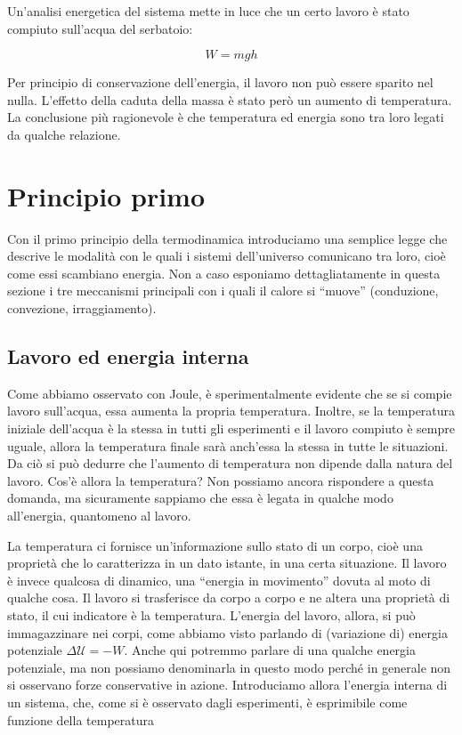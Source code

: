 Un'analisi energetica del sistema mette in luce che un certo lavoro è
stato compiuto sull'acqua del serbatoio:

\[ W = mgh \]

\noindent Per principio di conservazione dell'energia, il lavoro non
può essere sparito nel nulla. L'effetto della caduta della massa è stato però un aumento di temperatura.
La conclusione più ragionevole è che temperatura ed energia sono tra
loro legati da qualche relazione.




\section{Principio primo}
Con il primo principio della termodinamica introduciamo una semplice
legge che descrive le modalità con le quali i sistemi dell'universo
comunicano tra loro, cioè come essi scambiano energia. Non a caso
esponiamo dettagliatamente in questa sezione i tre meccanismi
principali con i quali il calore si ``muove'' (conduzione, convezione,
irraggiamento).


\subsection{Lavoro ed energia interna}
Come abbiamo osservato con Joule, è sperimentalmente evidente che
se si compie lavoro sull'acqua, essa
aumenta la propria temperatura. Inoltre, se la temperatura iniziale
dell'acqua è la stessa in tutti gli esperimenti e il lavoro compiuto
è sempre uguale, allora la temperatura finale sarà anch'essa la stessa
in tutte le situazioni. Da ciò si può dedurre che l'aumento di
temperatura non dipende dalla natura del lavoro. Cos'è allora la
temperatura? Non possiamo ancora rispondere a questa domanda, ma
sicuramente sappiamo che essa è legata in qualche modo all'energia,
quantomeno al lavoro.

La temperatura ci fornisce un'informazione sullo stato di
un corpo, cioè una proprietà che lo caratterizza in un dato istante,
in una certa situazione. Il lavoro è invece qualcosa di dinamico,
una ``energia in movimento'' dovuta al moto di qualche cosa. Il
lavoro si trasferisce da corpo a corpo e ne altera una proprietà di
stato, il cui indicatore è la temperatura. L'energia del lavoro,
allora, si può immagazzinare nei corpi, come abbiamo visto parlando
di (variazione di) energia potenziale $\Delta\mathcal{U} = -W$.
Anche qui potremmo parlare di una qualche energia potenziale, ma
non possiamo denominarla in questo modo perché in generale non
si osservano forze conservative in azione. Introduciamo allora
l'energia interna di un sistema, che, come si è osservato
dagli esperimenti, è esprimibile come funzione della temperatura

